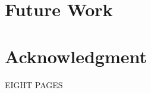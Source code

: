 \documentclass[conference]{IEEEtran}
\begin{document}
\section{Future Work}



\section*{Acknowledgment}





\color{red}
\centering
EIGHT PAGES
\end{document}
